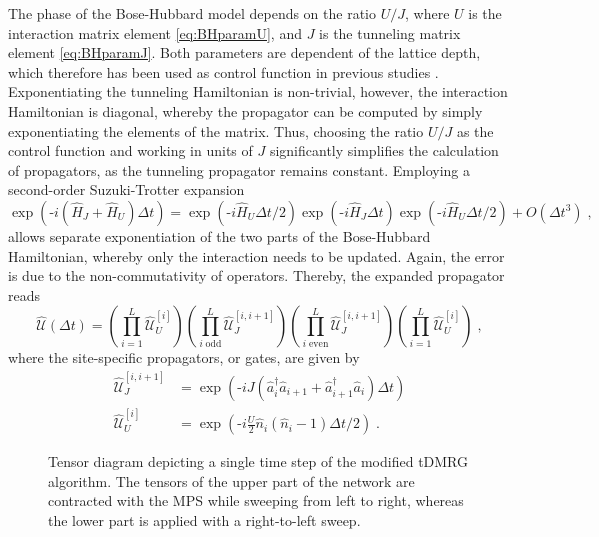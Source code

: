 The phase of the Bose-Hubbard model depends on the ratio $U/J$, where $U$ is the interaction matrix element \eqref{eq:BHparamU}, and $J$ is the tunneling matrix element \eqref{eq:BHparamJ}. Both parameters are dependent of the lattice depth, which therefore has been used as control function in previous studies \cite{FrankBloch,Doria2011}. Exponentiating the tunneling Hamiltonian is non-trivial, however, the interaction Hamiltonian is diagonal, whereby the propagator can be computed by simply exponentiating the elements of the matrix. Thus, choosing the ratio $U/J$ as the control function and working in units of $J$ significantly simplifies the calculation of propagators, as the tunneling propagator remains constant. Employing a second-order Suzuki-Trotter expansion
\begin{equation}
	\exp\left( \text{-}i ( \hat{H}_J + \hat{H}_U  ) \Delta t \right) = \exp\left( \text{-} i \hat{H}_U \Delta t /2  \right) \exp\left( \text{-} i \hat{H}_J \Delta  t \right) \exp\left( \text{-} i \hat{H}_U \Delta t /2  \right) + O(\Delta t^3) \; ,
	\label{eq:SuzukiTrotter}
\end{equation}
allows separate exponentiation of the two parts of the Bose-Hubbard Hamiltonian, whereby only the interaction needs to be updated. Again, the error is due to the non-commutativity of operators. Thereby, the expanded propagator reads
\begin{equation}
	\hat{\mathcal{U}} (\Delta t) = \left( \prod_{i = 1}^{L} \hat{\mathcal{U}}_{U}^{[i]} \right) \left( \prod_{i \; \mathrm{odd}}^{L} \hat{\mathcal{U}}_{J}^{[i,i+1]}  \right) \left( \prod_{i \; \mathrm{even}}^{L} \hat{\mathcal{U}}_{J}^{[i,i+1]}  \right) \left( \prod_{i = 1}^{L} \hat{\mathcal{U}}_{U}^{[i]} \right) \; ,
\end{equation}
where the site-specific propagators, or gates, are given by
\begin{align}
	\hat{\mathcal{U}}_{J}^{[i,i+1]} &= \exp \left( \text{-} i J ( \hat{a}_{i}^{\dag} \hat{a}_{i+1} + \hat{a}_{i+1}^{\dag} \hat{a}_{i} ) \Delta t \right) \\
	\hat{\mathcal{U}}_{U}^{[i]} &= \exp \left( \text{-} i \frac{U}{2} \hat{n}_i (\hat{n}_i -1) \Delta t /2 \right) \; .
\end{align}
\begin{figure}[h!]
	\centering
	
	\caption{Tensor diagram depicting a single time step of the modified tDMRG algorithm. The tensors of the upper part of the network are contracted with the MPS while sweeping from left to right, whereas the lower part is applied with a right-to-left sweep.}
	\label{fig:ModifiedTEBD}
\end{figure}
